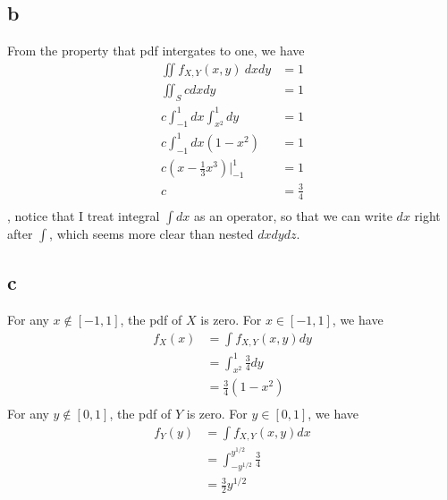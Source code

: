 \documentclass[12pt,letterpaper]{article}
\begin{document}
    \subsection*{b}
        From the property that pdf intergates to one, we have
        \begin{equation*}
            \begin{aligned}
                \iint f_{X, Y}(x, y)\ dxdy &= 1 \\
                \iint_{S} c dxdy &= 1 \\
                c\int_{-1}^{1} dx \int_{x^{2}}^{1} dy &= 1 \\
                c \int_{-1}^{1} dx (1 - x^{2}) &= 1 \\
                c (x - \frac{1}{3}x^{3})|_{-1}^{1} &= 1 \\
                c &= \frac{3}{4} \\
            \end{aligned}
        \end{equation*}
        , notice that I treat integral $\int dx$ as an operator, so that we can write $dx$ right after $\int$, which seems more clear than nested $dx dy dz$.
    \subsection*{c}
        For any $x \not\in [-1, 1]$, the pdf of $X$ is zero. For $x \in [-1, 1]$, we have
        \begin{equation*}
            \begin{aligned}
                f_{X}(x) &= \int f_{X, Y}(x, y) dy \\
                &= \int_{x^{2}}^{1} \frac{3}{4} dy \\
                &= \frac{3}{4}(1 - x^{2}) \\
            \end{aligned}
        \end{equation*}
        For any $y \not\in [0, 1]$, the pdf of $Y$ is zero. For $y \in [0, 1]$, we have
        \begin{equation*}
            \begin{aligned}
                f_{Y}(y) &= \int f_{X, Y}(x, y) dx \\
                &= \int_{-y^{1/2}}^{y^{1/2}} \frac{3}{4} \\
                &= \frac{3}{2} y^{1/2} \\
            \end{aligned}
        \end{equation*}
\end{document}

